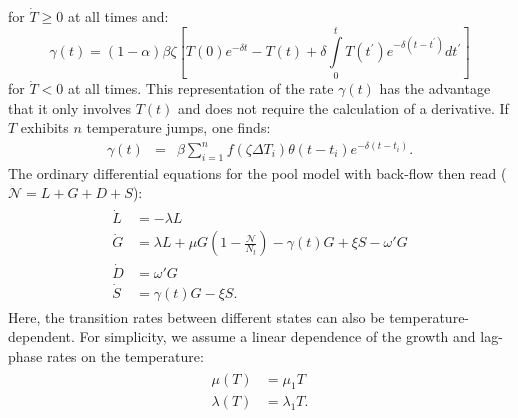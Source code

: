 \documentclass[10pt,1p,authoryear]{elsarticle}
\numberwithin{equation}{section}
\begin{document}
for $\dot{T}\ge 0$ at all times and:
\begin{equation}
    \gamma(t) = (1-\alpha)\beta\zeta\left [T(0)e^{-\delta t}-T(t)+\delta
        \int\limits_0^t T(t^{\prime})e^{-\delta (t-t^{\prime})}dt^{\prime}\right ]
\end{equation}
for $\dot{T}< 0$ at all times.
This representation of the rate $\gamma(t)$ has the advantage that it only involves $T(t)$ and does not require the calculation of a derivative.
If $T$ exhibits $n$ temperature jumps, one finds:
\begin{eqnarray}
    \gamma(t) &=& \beta\sum_{i=1}^n f\left(\zeta\Delta T_i \right)\theta(t-t_i)e^{-\delta(t-t_i)}.
\label{eq:gamma_tempshift}
\end{eqnarray}
%
The ordinary differential equations for the pool model with back-flow then read ($\mathcal{N}=L+G+D+S$):
\begin{align}
    \begin{split}
        \dot{L} &= - \lambda L\\
        \dot{G} &= \lambda L + \mu G\left(1-\frac{\mathcal{N}}{N_t}\right)-\gamma(t) G + \xi S - \omega' G\\
        \dot{D} &= \omega' G\\
        \dot{S} &= \gamma(t) G - \xi S.
    \end{split}
    \label{eq:ode_tempshift_backlag}
\end{align}
Here, the transition rates between different states can also be temperature-dependent.
For simplicity, we assume a linear dependence of the growth and lag-phase rates on the temperature:
\begin{align}
    \begin{split}
        \mu(T)  &= \mu_1 T\\
        \lambda(T) &= \lambda_1 T.
    \end{split}
    \label{eq:rates_temp_linear}
\end{align}
\end{document}
